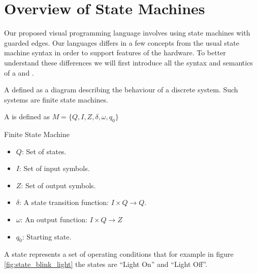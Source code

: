 \section{Overview of State Machines} \label{sec:overviewstatechart}

Our proposed visual programming language involves using state machines with guarded edges. Our languages differs in a few concepts from the usual state machine syntax in order to support features of the hardware. To better understand these differences we will first introduce all the syntax and semantics of a \cite{booth} and \cite{UML2}.

A \cite{booth} defined as a diagram describing the behaviour of a discrete system. Such systems are finite state machines. 

A  is defined as $M = \lbrace Q, I, Z, \delta, \omega, q_0\rbrace$

\begin{definition}
Finite State Machine

\label{def:statecharts}
\begin{itemize}
	\item $Q$: Set of states.
	\item $I$: Set of input symbols.
	\item $Z$: Set of output symbols.
	\item $\delta$: A state transition function: $I \times Q \rightarrow Q$. 
	\item $\omega$: An output function: $I \times Q \rightarrow Z$
	\item $q_0$: Starting state.
\end{itemize}
\end{definition}

A state represents a set of operating conditions that for example in figure \ref{fig:state_blink_light} the states are ``Light On'' and ``Light Off''.

